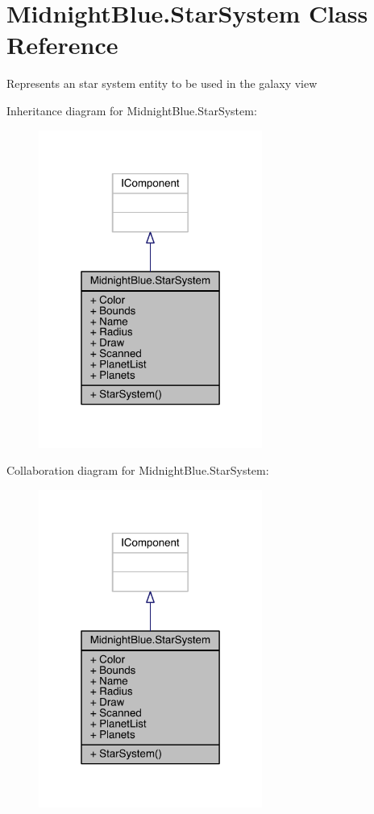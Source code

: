 \hypertarget{class_midnight_blue_1_1_star_system}{}\section{Midnight\+Blue.\+Star\+System Class Reference}
\label{class_midnight_blue_1_1_star_system}


Represents an star system entity to be used in the galaxy view  




Inheritance diagram for Midnight\+Blue.\+Star\+System\+:
\nopagebreak
\begin{figure}[H]
\begin{center}
\leavevmode
\includegraphics[width=208pt]{class_midnight_blue_1_1_star_system__inherit__graph}
\end{center}
\end{figure}


Collaboration diagram for Midnight\+Blue.\+Star\+System\+:
\nopagebreak
\begin{figure}[H]
\begin{center}
\leavevmode
\includegraphics[width=208pt]{class_midnight_blue_1_1_star_system__coll__graph}
\end{center}
\end{figure}
